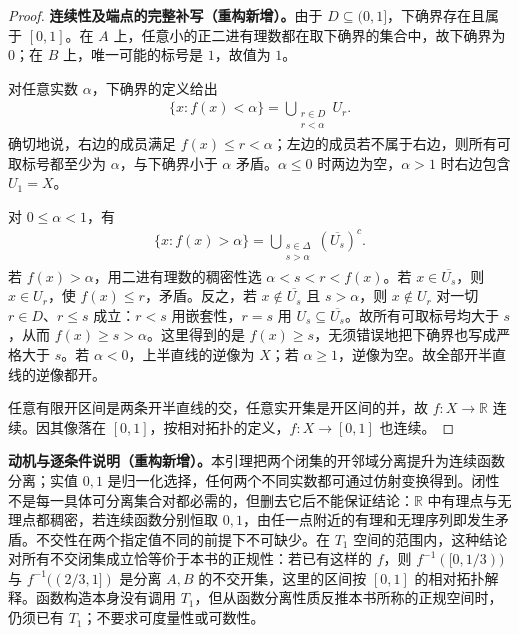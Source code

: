 \documentclass[../../main.tex]{subfiles}%
\begin{document}
\begin{proof}
\textbf{连续性及端点的完整补写（重构新增）。}由于 $D\subseteq(0,1]$，下确界存在且属于 $[0,1]$。在 $A$ 上，任意小的正二进有理数都在取下确界的集合中，故下确界为 $0$；在 $B$ 上，唯一可能的标号是 $1$，故值为 $1$。

对任意实数 $\alpha$，下确界的定义给出
\begin{align*}
\{x:f(x)<\alpha\}=\bigcup_{\substack{r\in D\\r<\alpha}}U_r.
\end{align*}
确切地说，右边的成员满足 $f(x)\le r<\alpha$；左边的成员若不属于右边，则所有可取标号都至少为 $\alpha$，与下确界小于 $\alpha$ 矛盾。$\alpha\le0$ 时两边为空，$\alpha>1$ 时右边包含 $U_1=X$。

对 $0\le\alpha<1$，有
\begin{align*}
\{x:f(x)>\alpha\}
=\bigcup_{\substack{s\in\Delta\\s>\alpha}}(\overline{U_s})^c.
\end{align*}
若 $f(x)>\alpha$，用二进有理数的稠密性选 $\alpha<s<r<f(x)$。若 $x\in\overline{U_s}$，则 $x\in U_r$，使 $f(x)\le r$，矛盾。反之，若 $x\notin\overline{U_s}$ 且 $s>\alpha$，则 $x\notin U_r$ 对一切 $r\in D$、$r\le s$ 成立：$r<s$ 用嵌套性，$r=s$ 用 $U_s\subseteq\overline{U_s}$。故所有可取标号均大于 $s$，从而 $f(x)\ge s>\alpha$。这里得到的是 $f(x)\ge s$，无须错误地把下确界也写成严格大于 $s$。若 $\alpha<0$，上半直线的逆像为 $X$；若 $\alpha\ge1$，逆像为空。故全部开半直线的逆像都开。

任意有限开区间是两条开半直线的交，任意实开集是开区间的并，故 $f:X\to\mathbb R$ 连续。因其像落在 $[0,1]$，按相对拓扑的定义，$f:X\to[0,1]$ 也连续。
\end{proof}
\begin{remark}
\textbf{动机与逐条件说明（重构新增）。}本引理把两个闭集的开邻域分离提升为连续函数分离；实值 $0,1$ 是归一化选择，任何两个不同实数都可通过仿射变换得到。闭性不是每一具体可分离集合对都必需的，但删去它后不能保证结论：$\mathbb R$ 中有理点与无理点都稠密，若连续函数分别恒取 $0,1$，由任一点附近的有理和无理序列即发生矛盾。不交性在两个指定值不同的前提下不可缺少。在 $T_1$ 空间的范围内，这种结论对所有不交闭集成立恰等价于本书的正规性：若已有这样的 $f$，则 $f^{-1}([0,1/3))$ 与 $f^{-1}((2/3,1])$ 是分离 $A,B$ 的不交开集，这里的区间按 $[0,1]$ 的相对拓扑解释。函数构造本身没有调用 $T_1$，但从函数分离性质反推本书所称的正规空间时，仍须已有 $T_1$；不要求可度量性或可数性。
\end{remark}
\end{document}
